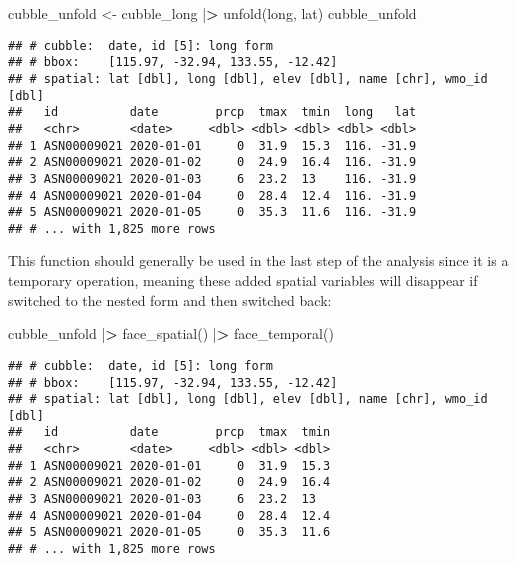 \documentclass{article}
\newenvironment{Shaded}{\begin{snugshade}}{\end{snugshade}}
\newcommand{\ErrorTok}[1]{\textcolor[rgb]{0.64,0.00,0.00}{\textbf{#1}}}
\newcommand{\FunctionTok}[1]{\textcolor[rgb]{0.00,0.00,0.00}{#1}}
\newcommand{\NormalTok}[1]{#1}
\newcommand{\OtherTok}[1]{\textcolor[rgb]{0.56,0.35,0.01}{#1}}
\newcommand{\SpecialCharTok}[1]{\textcolor[rgb]{0.00,0.00,0.00}{#1}}
\begin{document}
\begin{Shaded}
\begin{Highlighting}[]
\NormalTok{cubble\_unfold }\OtherTok{\textless{}{-}}\NormalTok{ cubble\_long }\SpecialCharTok{|}\ErrorTok{\textgreater{}} \FunctionTok{unfold}\NormalTok{(long, lat)}
\NormalTok{cubble\_unfold}
\end{Highlighting}
\end{Shaded}

\begin{verbatim}
## # cubble:  date, id [5]: long form
## # bbox:    [115.97, -32.94, 133.55, -12.42]
## # spatial: lat [dbl], long [dbl], elev [dbl], name [chr], wmo_id [dbl]
##   id          date        prcp  tmax  tmin  long   lat
##   <chr>       <date>     <dbl> <dbl> <dbl> <dbl> <dbl>
## 1 ASN00009021 2020-01-01     0  31.9  15.3  116. -31.9
## 2 ASN00009021 2020-01-02     0  24.9  16.4  116. -31.9
## 3 ASN00009021 2020-01-03     6  23.2  13    116. -31.9
## 4 ASN00009021 2020-01-04     0  28.4  12.4  116. -31.9
## 5 ASN00009021 2020-01-05     0  35.3  11.6  116. -31.9
## # ... with 1,825 more rows
\end{verbatim}

This function should generally be used in the last step of the analysis since it is a temporary operation, meaning these added spatial variables will disappear if switched to the nested form and then switched back:

\begin{Shaded}
\begin{Highlighting}[]
\NormalTok{cubble\_unfold }\SpecialCharTok{|}\ErrorTok{\textgreater{}} \FunctionTok{face\_spatial}\NormalTok{() }\SpecialCharTok{|}\ErrorTok{\textgreater{}} \FunctionTok{face\_temporal}\NormalTok{()}
\end{Highlighting}
\end{Shaded}

\begin{verbatim}
## # cubble:  date, id [5]: long form
## # bbox:    [115.97, -32.94, 133.55, -12.42]
## # spatial: lat [dbl], long [dbl], elev [dbl], name [chr], wmo_id [dbl]
##   id          date        prcp  tmax  tmin
##   <chr>       <date>     <dbl> <dbl> <dbl>
## 1 ASN00009021 2020-01-01     0  31.9  15.3
## 2 ASN00009021 2020-01-02     0  24.9  16.4
## 3 ASN00009021 2020-01-03     6  23.2  13  
## 4 ASN00009021 2020-01-04     0  28.4  12.4
## 5 ASN00009021 2020-01-05     0  35.3  11.6
## # ... with 1,825 more rows
\end{verbatim}
\end{document}
